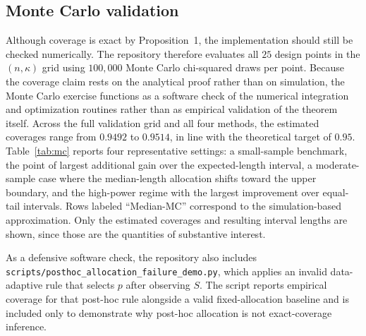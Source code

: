 \documentclass[11pt]{article}
\begin{document}
\subsection{Monte Carlo validation}
Although coverage is exact by Proposition~1, the implementation should still be checked numerically. The repository therefore evaluates all $25$ design points in the $(n,\kappa)$ grid using $100{,}000$ Monte Carlo chi-squared draws per point. Because the coverage claim rests on the analytical proof rather than on simulation, the Monte Carlo exercise functions as a software check of the numerical integration and optimization routines rather than as empirical validation of the theorem itself. Across the full validation grid and all four methods, the estimated coverages range from $0.9492$ to $0.9514$, in line with the theoretical target of $0.95$. Table~\ref{tab:mc} reports four representative settings: a small-sample benchmark, the point of largest additional gain over the expected-length interval, a moderate-sample case where the median-length allocation shifts toward the upper boundary, and the high-power regime with the largest improvement over equal-tail intervals. Rows labeled ``Median-MC'' correspond to the simulation-based approximation. Only the estimated coverages and resulting interval lengths are shown, since those are the quantities of substantive interest.

\begin{table}[htbp]
\centering
\caption{Representative Monte Carlo validation settings drawn from the full $(n,\kappa)$ grid, based on $100{,}000$ chi-squared draws per setting.}
\label{tab:mc}
\resizebox{0.9\textwidth}{!}{}
\end{table}

As a defensive software check, the repository also includes \texttt{scripts/posthoc\_allocation\_failure\_demo.py}, which applies an invalid data-adaptive rule that selects $p$ after observing $S$. The script reports empirical coverage for that post-hoc rule alongside a valid fixed-allocation baseline and is included only to demonstrate why post-hoc allocation is not exact-coverage inference.
\end{document}
